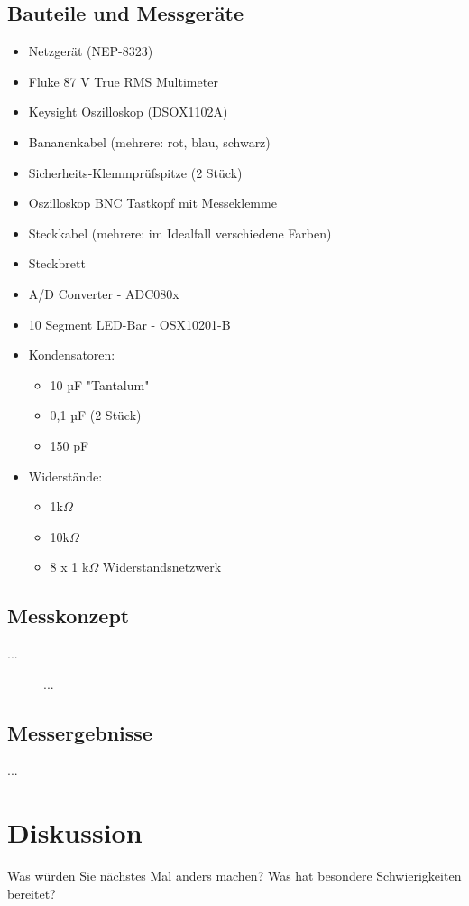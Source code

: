 \documentclass[a4paper,12pt]{article}
\begin{document}
\subsection{Bauteile und Messgeräte}
\begin{itemize}
\item Netzgerät (NEP-8323)
\item Fluke 87 V True RMS Multimeter
\item Keysight Oszilloskop (DSOX1102A)
\item Bananenkabel (mehrere: rot, blau, schwarz)
\item Sicherheits-Klemmprüfspitze (2 Stück)
\item Oszilloskop BNC Tastkopf mit Messeklemme
\item Steckkabel (mehrere: im Idealfall verschiedene Farben)
\item Steckbrett\\
\end{itemize}


\begin{itemize}
\item A/D Converter - ADC080x
\item 10 Segment LED-Bar - OSX10201-B
\newpage
\item Kondensatoren: 
	\begin{itemize}
	\item 10 µF "Tantalum"
	\item 0,1 µF (2 Stück)
	\item 150 pF
	\end{itemize}
\item Widerstände: 
	\begin{itemize}
	\item 1k$\Omega$
	\item 10k$\Omega$
	\item 8 x 1 k$\Omega$ Widerstandsnetzwerk
	\end{itemize}
\end{itemize}

\subsection{Messkonzept}
...

\begin{figure}[H]
    \centering
\caption{...}
\end{figure}


\subsection{Messergebnisse}
...




\section{Diskussion}
Was würden Sie nächstes Mal anders machen? Was hat besondere Schwierigkeiten bereitet?
\end{document}
